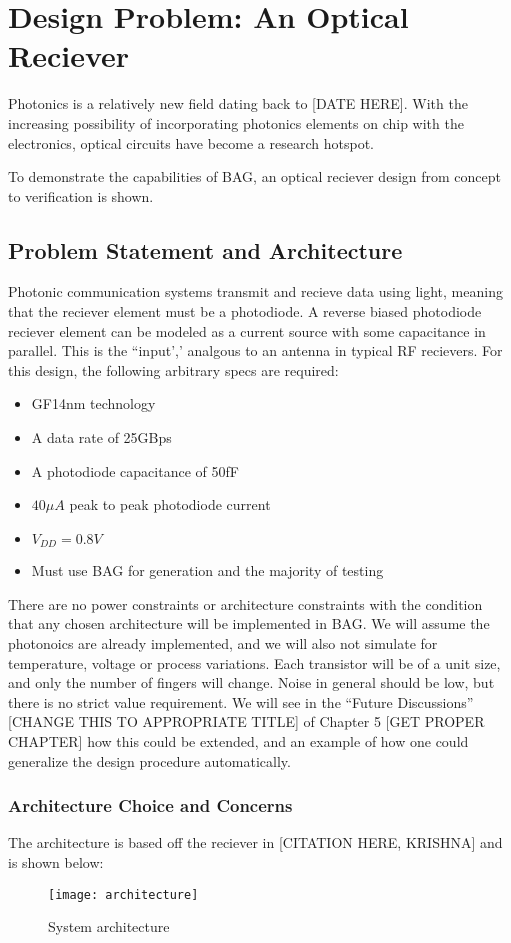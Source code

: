 \chapter{Design Problem: An Optical Reciever}

Photonics is a relatively new field dating back to [DATE HERE]. With the increasing possibility of incorporating photonics elements on chip with the electronics, optical circuits have become a research hotspot. 

To demonstrate the capabilities of BAG, an optical reciever design from concept to verification is shown.

\section{Problem Statement and Architecture}
Photonic communication systems transmit and recieve data using light, meaning that the reciever element must be a photodiode. A reverse biased photodiode reciever element can be modeled as a current source with some capacitance in parallel. This is the ``input',' analgous to an antenna in typical RF recievers. For this design, the following arbitrary specs are required:
\begin{itemize}
\item GF14nm technology
\item A data rate of 25GBps
\item A photodiode capacitance of 50fF
\item $40\mu A$ peak to peak photodiode current
\item $V_{DD}=0.8V$
\item Must use BAG for generation and the majority of testing
\end{itemize}

There are no power constraints or architecture constraints with the condition that any chosen architecture will be implemented in BAG. We will assume the photonoics are already implemented, and we will also not simulate for temperature, voltage or process variations. Each transistor will be of a unit size, and only the number of fingers will change. Noise in general should be low, but there is no strict value requirement. We will see in the ``Future Discussions'' [CHANGE THIS TO APPROPRIATE TITLE] of Chapter 5 [GET PROPER CHAPTER] how this could be extended, and an example of how one could generalize the design procedure automatically.

\subsection{Architecture Choice and Concerns}
The architecture is based off the reciever in [CITATION HERE, KRISHNA] and is shown below:
\begin{figure}[h]
\centering
\texttt{[image: architecture]}
\caption{System architecture}
\label{fig:System Architecture}
\end{figure}


